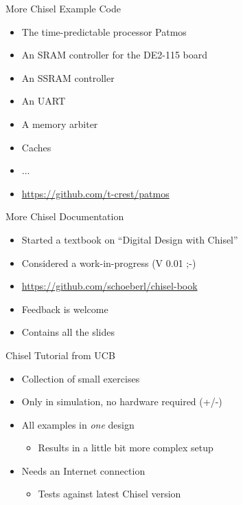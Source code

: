 \documentclass[xcolor=pdflatex,dvipsnames,table]{beamer}
\begin{document}
\begin{frame}[fragile]{More Chisel Example Code}
\begin{itemize}
\item The time-predictable processor Patmos
\item An SRAM controller for the DE2-115 board
\item An SSRAM controller
\item An UART
\item A memory arbiter
\item Caches
\item ...
\item \url{https://github.com/t-crest/patmos}
\end{itemize}
\end{frame}


\begin{frame}[fragile]{More Chisel Documentation}
\begin{itemize}
\item Started a textbook on ``Digital Design with Chisel''
\item Considered a work-in-progress (V 0.01 ;-)
\item \url{https://github.com/schoeberl/chisel-book}
\item Feedback is welcome
\item Contains all the slides
\end{itemize}
\end{frame}

\begin{frame}[fragile]{Chisel Tutorial from UCB}
\begin{itemize}
\item Collection of small exercises
\item Only in simulation, no hardware required (+/-)
\item All examples in \emph{one} design
\begin{itemize}
\item Results in a little bit more complex setup
\end{itemize}
\item Needs an Internet connection
\begin{itemize}
\item  Tests against latest Chisel version
\end{itemize}
\end{itemize}
\end{frame}
\end{document}
